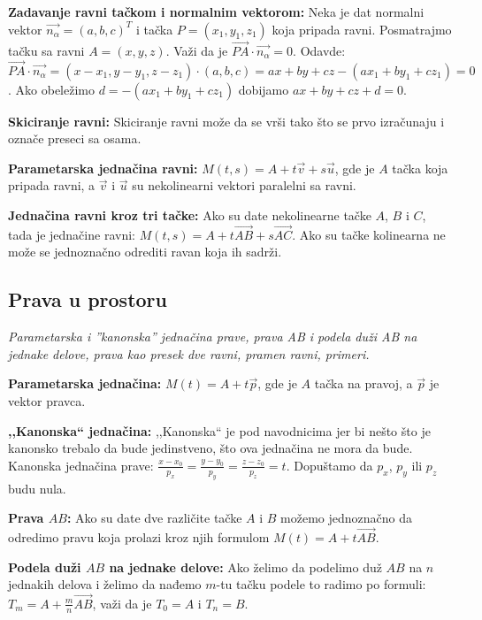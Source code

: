 \documentclass[12pt]{article}
\newcommand{\vek}[1]{\overrightarrow{#1}}
\begin{document}
\textbf{Zadavanje ravni tačkom i normalnim vektorom:} Neka je dat normalni
vektor $\vek{n_\alpha}=(a,b,c)^T$ i tačka $P=(x_1,y_1,z_1)$ koja pripada ravni.
Posmatrajmo tačku sa ravni $A=(x,y,z)$. Važi da je
$\vek{PA}\cdot\vek{n_\alpha}=0$. Odavde:
$\vek{PA}\cdot\vek{n_\alpha}=(x-x_1,y-y_1,z-z_1)\cdot(a,b,c)=ax+by+cz-
    (ax_1+by_1+cz_1)=0$. Ako obeležimo $d=-(ax_1+by_1+cz_1)$ dobijamo
$ax+by+cz+d=0$.
\par

\textbf{Skiciranje ravni:} Skiciranje ravni može da se vrši tako što se prvo
izračunaju i označe preseci sa osama.
\par

\textbf{Parametarska jednačina ravni:} $M(t,s)=A+t\vek{v}+s\vek{u}$, gde je $A$
tačka koja pripada ravni, a $\vek{v}$ i $\vek{u}$ su nekolinearni vektori
paralelni sa ravni.
\par

\textbf{Jednačina ravni kroz tri tačke:} Ako su date nekolinearne tačke $A$,
$B$ i $C$, tada je jednačine ravni: $M(t,s)=A+t\vek{AB}+s\vek{AC}$.
Ako su tačke kolinearna ne može se jednoznačno odrediti ravan koja ih sadrži.
\par

\subsection{Prava u prostoru}
\textit{Parametarska i ”kanonska” jednačina prave, prava AB i podela duži AB
    na jednake delove, prava kao presek dve ravni, pramen ravni, primeri.}
\par
\vspace*{1cm}

\textbf{Parametarska jednačina:} $M(t)=A+t\vek{p}$, gde je $A$ tačka na pravoj,
a $\vek{p}$ je vektor pravca.
\par

\textbf{,,Kanonska`` jednačina:} ,,Kanonska`` je pod navodnicima jer bi nešto
što je kanonsko trebalo da bude jedinstveno, što ova jednačina ne mora da bude.
Kanonska jednačina prave:
$\frac{x-x_0}{p_x}=\frac{y-y_0}{p_y}=\frac{z-z_0}{p_z}=t$. Dopuštamo da $p_x$,
$p_y$ ili $p_z$ budu nula.
\par

\textbf{Prava $AB$:} Ako su date dve različite tačke $A$ i $B$ možemo
jednoznačno da odredimo pravu koja prolazi kroz njih formulom
$M(t)=A+t\vek{AB}$.
\par

\textbf{Podela duži $AB$ na jednake delove:} Ako želimo da podelimo duž $AB$ na
$n$ jednakih delova i želimo da nađemo $m$-tu tačku podele to radimo po formuli:
$T_m=A+\frac{m}{n}\vek{AB}$, važi da je $T_0=A$ i $T_n=B$.
\par
\end{document}
